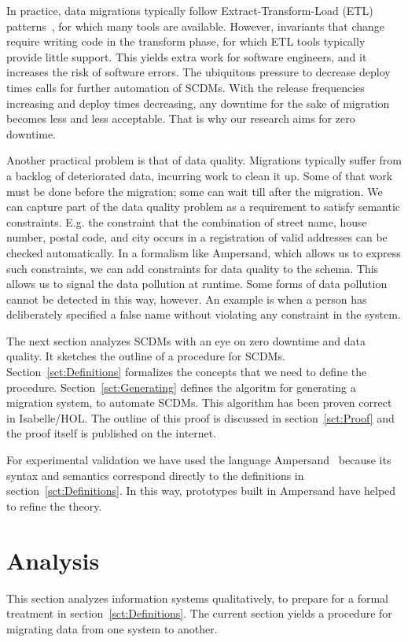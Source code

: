 \documentclass[runningheads]{llncs}
\begin{document}
   In practice, data migrations typically follow Extract-Transform-Load (ETL) patterns~\cite{Theodorou2017},
   for which many tools are available.
   However, invariants that change require writing code in the transform phase,
   for which ETL tools typically provide little support.
   This yields extra work for software engineers, and it increases the risk of software errors.
   The ubiquitous pressure to decrease deploy times calls for further automation of SCDMs.
   With the release frequencies increasing and deploy times decreasing, any downtime for the sake of migration becomes less and less acceptable.
   That is why our research aims for zero downtime.

   Another practical problem is that of data quality.
   Migrations typically suffer from a backlog of deteriorated data, incurring work to clean it up.
   Some of that work must be done before the migration; some can wait till after the migration.
   We can capture part of the data quality problem as a requirement to satisfy semantic constraints.
   E.g. the constraint that the combination of street name, house number, postal code, and city occurs in
   a registration of valid addresses can be checked automatically.
   In a formalism like Ampersand, which allows us to express such constraints, we can add constraints for data quality to the schema.
   This allows us to signal the data pollution at runtime.
   Some forms of data pollution cannot be detected in this way, however.
   An example is when a person has deliberately specified a false name without violating any constraint in the system.

   The next section analyzes SCDMs with an eye on zero downtime and data quality.
   It sketches the outline of a procedure for SCDMs.
   Section~\ref{sct:Definitions} formalizes the concepts that we need to define the procedure.
   Section~\ref{sct:Generating} defines the algoritm for generating a migration system, to automate SCDMs.
   This algorithm has been proven correct in Isabelle/HOL.
   The outline of this proof is discussed in section~\ref{sct:Proof} and the proof itself is published on the internet.

   For experimental validation we have used the language Ampersand~\cite{JoostenRAMiCS2017,Joosten-JLAMP2018}
   because its syntax and semantics correspond directly to the definitions in section~\ref{sct:Definitions}.
   In this way, prototypes built in Ampersand have helped to refine the theory.

\section{Analysis}
\label{sct:Analysis}
   This section analyzes information systems qualitatively, to prepare for a formal treatment in section~\ref{sct:Definitions}.
   The current section yields a procedure for migrating data from one system to another.
\end{document}
